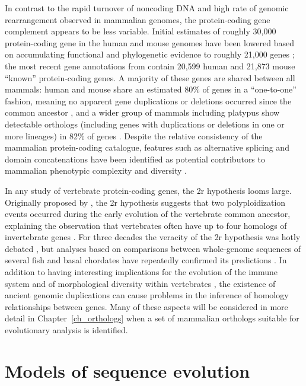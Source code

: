 In contrast to the rapid turnover of noncoding DNA and high rate of
genomic rearrangement observed in mammalian genomes, the
protein-coding gene complement appears to be less variable. Initial
estimates of roughly 30,000 protein-coding gene
\citep{Lander2001,Mouse2002Initial} in the human and mouse genomes
have been lowered based on accumulating functional and phylogenetic
evidence to roughly 21,000 genes \citep{Macaque2007}; the most recent
gene annotations from \ens \citep{Flicek2011} contain 20,599 human and
21,873 mouse ``known'' protein-coding genes. A majority of these genes
are shared between all mammals: human and mouse share an estimated
80\% of genes in a ``one-to-one'' fashion, meaning no apparent gene
duplications or deletions occurred since the common ancestor
\citep{Mouse2002Initial}, and a wider group of mammals including
platypus show detectable orthologs (including genes with duplications
or deletions in one or more lineages) in 82\% of genes
\citep{Warren2008b}. Despite the relative consistency of the mammalian
protein-coding catalogue, features such as alternative splicing and
domain concatenations have been identified as potential contributors
to mammalian phenotypic complexity and diversity \citep{Lander2001}.

In any study of vertebrate protein-coding genes, the \ac{2r}
hypothesis looms large. Originally proposed by \citet{Ohno1970}, the
\ac{2r} hypothesis suggests that two polyploidization events occurred
during the early evolution of the vertebrate common ancestor,
explaining the observation that vertebrates often have up to four
homologs of invertebrate genes \citep{Hokamp2003}. For three decades
the veracity of the \ac{2r} hypothesis was hotly debated
\citep{McLysaght2002,Dehal2005}, but analyses based on comparisons
between whole-genome sequences of several fish and basal chordates
have repeatedly confirmed its predictions
\citep{Kasahara2007,Putnam2008b}. In addition to having interesting
implications for the evolution of the immune system and of
morphological diversity within vertebrates
\citep{Hughes1997,Hoffmann1999,Peer2009b}, the existence of ancient
genomic duplications can cause problems in the inference of homology
relationships between genes. Many of these aspects will be considered
in more detail in Chapter~\ref{ch_orthologs} when a set of mammalian
orthologs suitable for evolutionary analysis is identified.

\section{Models of sequence evolution}
\label{section_evolution_models}

